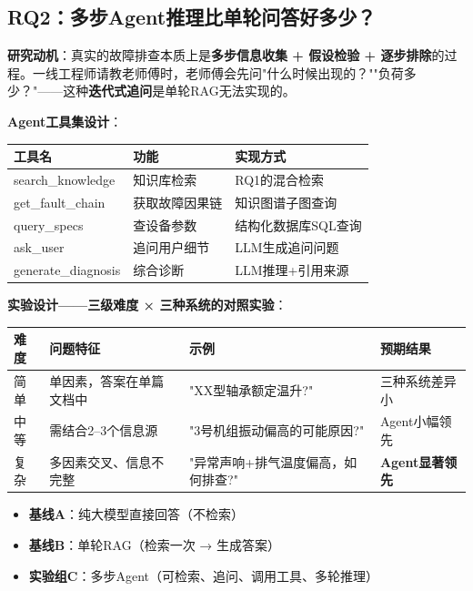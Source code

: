 \documentclass[a4paper, 11pt]{ctexart}
\begin{document}
\subsection{RQ2：多步Agent推理比单轮问答好多少？}

\textbf{研究动机}：真实的故障排查本质上是\textbf{多步信息收集 + 假设检验 + 逐步排除}的过程。一线工程师请教老师傅时，老师傅会先问"什么时候出现的？""负荷多少？"——这种\textbf{迭代式追问}是单轮RAG无法实现的。

\textbf{Agent工具集设计}：

\begin{table}[H]
\centering
\renewcommand{\arraystretch}{1.2}
\small
\begin{tabular}{p{3.5cm} p{4cm} p{5cm}}
    \toprule
    \textbf{工具名} & \textbf{功能} & \textbf{实现方式} \\
    \midrule
    search\_knowledge & 知识库检索 & RQ1的混合检索 \\
    get\_fault\_chain & 获取故障因果链 & 知识图谱子图查询 \\
    query\_specs & 查设备参数 & 结构化数据库SQL查询 \\
    ask\_user & 追问用户细节 & LLM生成追问问题 \\
    generate\_diagnosis & 综合诊断 & LLM推理+引用来源 \\
    \bottomrule
\end{tabular}
\end{table}

\textbf{实验设计——三级难度 × 三种系统的对照实验}：

\begin{table}[H]
\centering
\renewcommand{\arraystretch}{1.2}
\small
\begin{tabular}{p{1.5cm} p{4cm} p{3.5cm} p{3.5cm}}
    \toprule
    \textbf{难度} & \textbf{问题特征} & \textbf{示例} & \textbf{预期结果} \\
    \midrule
    简单 & 单因素，答案在单篇文档中 & "XX型轴承额定温升?" & 三种系统差异小 \\
    中等 & 需结合2--3个信息源 & "3号机组振动偏高的可能原因?" & Agent小幅领先 \\
    复杂 & 多因素交叉、信息不完整 & "异常声响+排气温度偏高，如何排查?" & \textbf{Agent显著领先} \\
    \bottomrule
\end{tabular}
\end{table}

\begin{itemize}
    \item \textbf{基线A}：纯大模型直接回答（不检索）
    \item \textbf{基线B}：单轮RAG（检索一次 → 生成答案）
    \item \textbf{实验组C}：多步Agent（可检索、追问、调用工具、多轮推理）
\end{itemize}
\end{document}
